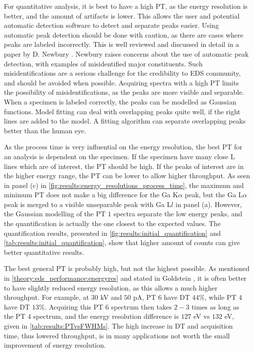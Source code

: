 For quantitative analysis, it is best to have a high PT, as the energy resolution is better, and the amount of artifacts is lower.
This allows the user and potential automatic detection software to detect and separate peaks easier.
Using automatic peak detection should be done with caution, as there are cases where peaks are labeled incorrectly.
This is well reviewed and discussed in detail in a paper by D. Newbury \cite{newbury_2005_misidentification}.
Newbury raises concerns about the use of automatic peak detection, with examples of misidentified major constituents.
Such misidentifications are a serious challenge for the credibility to EDS community, and should be avoided when possible.
Acquiring spectra with a high PT limits the possibility of misidentifications, as the peaks are more visible and separable.
When a specimen is labeled correctly, the peaks can be modelled as Gaussian functions.
Model fitting can deal with overlapping peaks quite well, if the right lines are added to the model.
A fitting algorithm can separate overlapping peaks better than the human eye.

As the process time is very influential on the energy resolution, the best PT for an analysis is dependent on the specimen.
If the specimen have many close L lines which are of interest, the PT should be high.
If the peaks of interest are in the higher energy range, the PT can be lower to allow higher throughput.
As seen in panel (c) in \cref{fig:results:energy_resolutions_process_time}, the maximum and minimum PT does not make a big difference for the Ga K$\alpha$ peak, but the Ga L$\alpha$ peak is merged to a visible unseparable peak with Ga L$l$ in panel (a).
However, the Gaussian modelling of the PT $1$ spectra separate the low energy peaks, and the quantification is actually the one closest to the expected values.
The quantification results, presented in \cref{fig:results:initial_quantification} and \cref{tab:results:initial_quantification}, show that higher amount of counts can give better quantitative results.


The best general PT is probably high, but not the highest possible.
As mentioned in \cref{theory:eds_performance:energyres} and stated in Goldstein \cite{goldstein_scanning_2018}, it is often better to have slightly reduced energy resolution, as this allows a much higher throughput.
For example, at $30$ kV and $50$ pA, PT $6$ have DT $44$\%, while PT $4$ have DT $13$\%.
Acquiring this PT $6$ spectrum then takes $2-3$ times as long as the PT $4$ spectrum, and the energy resolution difference is $127$ eV vs $132$ eV, given in \cref{tab:results:PTvsFWHMs}.
The high increase in DT and acquisition time, thus lowered throughput, is in many applications not worth the small improvement of energy resolution.



